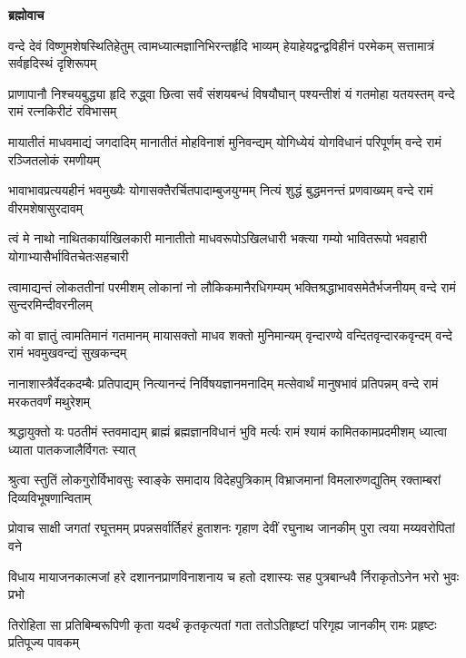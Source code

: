 \textbf{ब्रह्मोवाच}

\fourlineindentedshloka
{वन्दे देवं विष्णुमशेषस्थितिहेतुम्}
{त्वामध्यात्मज्ञानिभिरन्तर्हृदि भाव्यम्}
{हेयाहेयद्वन्द्वविहीनं परमेकम्}
{सत्तामात्रं सर्वहृदिस्थं दृशिरूपम्} %

\fourlineindentedshloka
{प्राणापानौ निश्चयबुद्ध्या हृदि रुद्ध्वा}
{छित्वा सर्वं संशयबन्धं विषयौघान्}
{पश्यन्तीशं यं गतमोहा यतयस्तम्}
{वन्दे रामं रत्नकिरीटं रविभासम्} %

\fourlineindentedshloka
{मायातीतं माधवमाद्यं जगदादिम्}
{मानातीतं मोहविनाशं मुनिवन्द्यम्}
{योगिध्येयं योगविधानं परिपूर्णम्}
{वन्दे रामं रञ्जितलोकं रमणीयम्} %

\fourlineindentedshloka
{भावाभावप्रत्ययहीनं भवमुख्यैः}
{योगासक्तैरर्चितपादाम्बुजयुग्मम्}
{नित्यं शुद्धं बुद्धमनन्तं प्रणवाख्यम्}
{वन्दे रामं वीरमशेषासुरदावम्} %

\fourlineindentedshloka
{त्वं मे नाथो नाथितकार्याखिलकारी}
{मानातीतो माधवरूपोऽखिलधारी}
{भक्त्या गम्यो भावितरूपो भवहारी}
{योगाभ्यासैर्भावितचेतःसहचारी} %

\fourlineindentedshloka
{त्वामाद्यन्तं लोकततीनां परमीशम्}
{लोकानां नो लौकिकमानैरधिगम्यम्}
{भक्तिश्रद्धाभावसमेतैर्भजनीयम्}
{वन्दे रामं सुन्दरमिन्दीवरनीलम्} %

\fourlineindentedshloka
{को वा ज्ञातुं त्वामतिमानं गतमानम्}
{मायासक्तो माधव शक्तो मुनिमान्यम्}
{वृन्दारण्ये वन्दितवृन्दारकवृन्दम्}
{वन्दे रामं भवमुखवन्द्यं सुखकन्दम्} %

\fourlineindentedshloka
{नानाशास्त्रैर्वेदकदम्बैः प्रतिपाद्यम्}
{नित्यानन्दं निर्विषयज्ञानमनादिम्}
{मत्सेवार्थं मानुषभावं प्रतिपन्नम्}
{वन्दे रामं मरकतवर्णं मथुरेशम्} %

\fourlineindentedshloka
{श्रद्धायुक्तो यः पठतीमं स्तवमाद्यम्}
{ब्राह्मं ब्रह्मज्ञानविधानं भुवि मर्त्यः}
{रामं श्यामं कामितकामप्रदमीशम्}
{ध्यात्वा ध्याता पातकजालैर्विगतः स्यात्} %

\fourlineindentedshloka
{श्रुत्वा स्तुतिं लोकगुरोर्विभावसुः}
{स्वाङ्के समादाय विदेहपुत्रिकाम्}
{विभ्राजमानां विमलारुणद्युतिम्}
{रक्ताम्बरां दिव्यविभूषणान्विताम्} %

\fourlineindentedshloka
{प्रोवाच साक्षी जगतां रघूत्तमम्}
{प्रपन्नसर्वार्तिहरं हुताशनः}
{गृहाण देवीं रघुनाथ जानकीम्}
{पुरा त्वया मय्यवरोपितां वने} %

\fourlineindentedshloka
{विधाय मायाजनकात्मजां हरे}
{दशाननप्राणविनाशनाय च}
{हतो दशास्यः सह पुत्रबान्धवै\-}
{र्निराकृतोऽनेन भरो भुवः प्रभो} %

\fourlineindentedshloka
{तिरोहिता सा प्रतिबिम्बरूपिणी}
{कृता यदर्थं कृतकृत्यतां गता}
{ततोऽतिहृष्टां परिगृह्य जानकीम्}
{रामः प्रहृष्टः प्रतिपूज्य पावकम्} %


